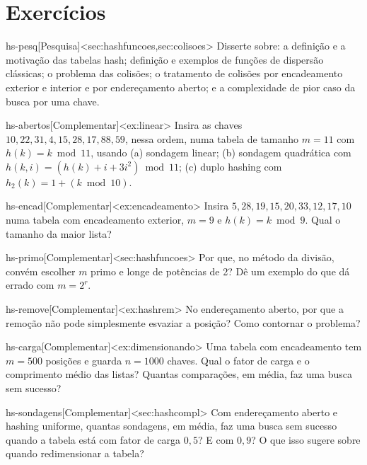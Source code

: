 \section{Exercícios}
\excurso
\begin{exercicio}{hs-pesq}[Pesquisa]<sec:hashfuncoes,sec:colisoes>
Disserte sobre: a definição e a motivação das tabelas hash; definição e exemplos de funções de dispersão clássicas; o problema das colisões; o tratamento de colisões por encadeamento exterior e interior e por endereçamento aberto; e a complexidade de pior caso da busca por uma chave.
\end{exercicio}

\excompl
\begin{exercicio}{hs-abertos}[Complementar]<ex:linear>
Insira as chaves $10,22,31,4,15,28,17,88,59$, nessa ordem, numa tabela de tamanho $m=11$ com $h(k)=k\bmod11$, usando (a) sondagem linear; (b) sondagem quadrática com $h(k,i)=(h(k)+i+3i^2)\bmod11$; (c) duplo hashing com $h_2(k)=1+(k\bmod10)$.
\end{exercicio}
\begin{exercicio}{hs-encad}[Complementar]<ex:encadeamento>
Insira $5,28,19,15,20,33,12,17,10$ numa tabela com encadeamento exterior, $m=9$ e $h(k)=k\bmod9$. Qual o tamanho da maior lista?
\end{exercicio}
\begin{exercicio}{hs-primo}[Complementar]<sec:hashfuncoes>
Por que, no método da divisão, convém escolher $m$ primo e longe de potências de 2? Dê um exemplo do que dá errado com $m=2^r$.
\end{exercicio}
\begin{exercicio}{hs-remove}[Complementar]<ex:hashrem>
No endereçamento aberto, por que a remoção não pode simplesmente esvaziar a posição? Como contornar o problema?
\end{exercicio}
\begin{exercicio}{hs-carga}[Complementar]<ex:dimensionando>
Uma tabela com encadeamento tem $m=500$ posições e guarda $n=1000$ chaves. Qual o fator de carga e o comprimento médio das listas? Quantas comparações, em média, faz uma busca sem sucesso?
\end{exercicio}
\begin{exercicio}{hs-sondagens}[Complementar]<sec:hashcompl>
Com endereçamento aberto e hashing uniforme, quantas sondagens, em média, faz uma busca sem sucesso quando a tabela está com fator de carga $0{,}5$? E com $0{,}9$? O que isso sugere sobre quando redimensionar a tabela?
\end{exercicio}

